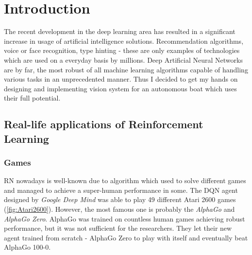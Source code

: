 \chapter{Introduction}
\label{cha:introduction}

The recent development in the deep learning area has resulted in a significant increase in usage of artificial intelligence solutions. Recommendation algorithms, voice or face recognition, type hinting - these are only examples of technologies which are used on a everyday basis by millions. Deep Artificial Neural Networks are by far, the most robust of all machine learning algorithms capable of handling various tasks in an unprecedented manner. Thus I decided to get my hands on designing and implementing vision system for an autonomous boat which uses their full potential.

\section{Real-life applications of Reinforcement Learning}
\label{sec:real-life-applications-of-deep-learning}

\subsection{Games}
\label{sub:intro-games}
RN nowadays is well-known due to algorithm which used to solve different games and managed to achieve a super-human performance in some.
The DQN agent designed by \emph{Google Deep Mind} was able to play 49 different Atari 2600 games (\ref{fig:Atari2600}). However, the most famous one is probably the \emph{AlphaGo} \cite{AlphaGO}  and \emph{AlphaGo Zero}. AlphaGo was trained on countless human games achieving robust performance, but it was not sufficient for the researchers. They let their new agent trained from scratch - AlphaGo Zero to play with itself and eventually beat AlphaGo 100-0. 

